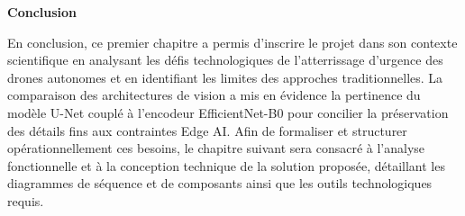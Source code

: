 \vspace{1.5em}
\textbf{Conclusion}

En conclusion, ce premier chapitre a permis d'inscrire le projet dans son contexte scientifique en analysant les défis technologiques de l'atterrissage d'urgence des drones autonomes et en identifiant les limites des approches traditionnelles. La comparaison des architectures de vision a mis en évidence la pertinence du modèle U-Net couplé à l'encodeur EfficientNet-B0 pour concilier la préservation des détails fins aux contraintes Edge AI. Afin de formaliser et structurer opérationnellement ces besoins, le chapitre suivant sera consacré à l'analyse fonctionnelle et à la conception technique de la solution proposée, détaillant les diagrammes de séquence et de composants ainsi que les outils technologiques requis.


\clearpage
